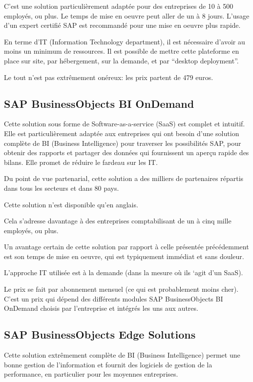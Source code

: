 C’est une solution particulièrement adaptée pour des entreprises de 10 à 500 employés, ou plus.
Le temps de mise en oeuvre peut aller de un à 8 jours. L’usage d’un expert certifié SAP est recommandé pour une mise en oeuvre plus rapide.

En terme d’IT (Information Technology department), il est nécessaire d’avoir au moins un minimum de ressources. Il est possible de mettre cette plateforme en place sur site, par hébergement, sur la demande, et par “desktop deployment”.

Le tout n’est pas extrêmement onéreux: les prix partent de 479 euros.

\subsection{SAP BusinessObjects BI OnDemand}

Cette solution sous forme de Software-as-a-service (SaaS) est complet et intuitif. Elle est particulièrement adaptée aux entreprises qui ont besoin d’une solution complète de BI (Business Intelligence) pour traverser les possibilités SAP, pour obtenir des rapports et partager des données qui fournissent un aperçu rapide des bilans. Elle promet de réduire le fardeau sur les IT.

Du point de vue partenarial, cette solution a des milliers de partenaires répartis dans tous les secteurs et dans 80 pays.

Cette solution n’est disponible qu’en anglais.

Cela s’adresse davantage à des entreprises comptabilisant de un à cinq mille employés, ou plus.

Un avantage certain de cette solution par rapport à celle présentée précédemment est son temps de mise en oeuvre, qui est typiquement immédiat et sans douleur.

L’approche IT utilisée est à la demande (dans la mesure où ils ‘agit d’un SaaS).

Le prix se fait par abonnement mensuel (ce qui est probablement moins cher). C’est un prix qui dépend des différents modules SAP BusinessObjects BI OnDemand choisis par l’entreprise et intégrés les uns aux autres.

\subsection{SAP BusinessObjects Edge Solutions}

Cette solution extrêmement complète de BI (Business Intelligence) permet une bonne gestion de l’information et fournit des logiciels de gestion de la performance, en particulier pour les moyennes entreprises.

